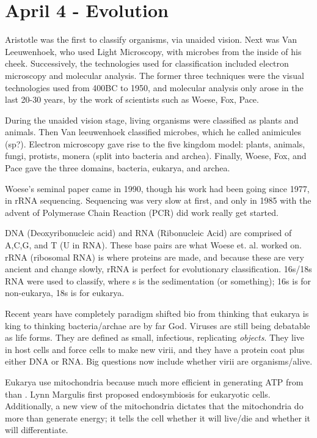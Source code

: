 \documentclass[12pt]{article}
\begin{document}
\section*{April 4 - Evolution}

Aristotle was the first to classify organisms, via unaided vision. Next was Van Leeuwenhoek, who used Light Microscopy, with microbes from the inside of his cheek. Successively, the technologies used for classification included electron microscopy and molecular analysis. The former three techniques were the visual technologies used from 400BC to 1950, and molecular analysis only arose in the last 20-30 years, by the work of scientists such as Woese, Fox, Pace.

During the unaided vision stage, living organisms were classified as plants and animals. Then Van leeuwenhoek classified microbes, which he called animicules (sp?). Electron microscopy gave rise to the five kingdom model: plants, animals, fungi, protists, monera (split into bacteria and archea). Finally, Woese, Fox, and Pace gave the three domains, bacteria, eukarya, and archea.

Woese's seminal paper came in 1990, though his work had been going since 1977, in rRNA sequencing. Sequencing was very slow at first, and only in 1985 with the advent of Polymerase Chain Reaction (PCR) did work really get started.

DNA (Deoxyribonucleic acid) and RNA (Ribonucleic Acid) are comprised of A,C,G, and T (U in RNA). These base pairs are what Woese et. al. worked on. rRNA (ribosomal RNA) is where proteins are made, and because these are very ancient and change slowly, rRNA is perfect for evolutionary classification. 16s/18s RNA were used to classify, where s is the sedimentation (or something); 16s is for non-eukarya, 18s is for eukarya. 

Recent years have completely paradigm shifted bio from thinking that eukarya is king to thinking bacteria/archae are by far God. Viruses are still being debatable as life forms. They are defined as small, infectious, replicating \emph{objects}. They live in host cells and force cells to make new virii, and they have a protein coat plus either DNA or RNA. Big questions now include whether virii are organisms/alive. 

Eukarya use mitochondria because much more efficient in generating ATP from  than . Lynn Margulis first proposed endosymbiosis for eukaryotic cells. Additionally, a new view of the mitochondria dictates that the mitochondria do more than generate energy; it tells the cell whether it will live/die and whether it will differentiate.
\end{document}
